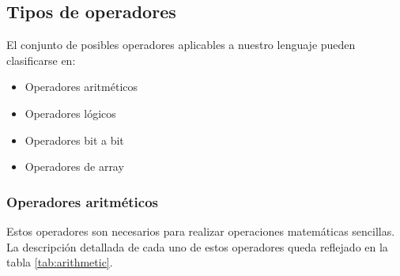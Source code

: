 \documentclass[11pt, english]{article}
\begin{document}
\subsection{Tipos de operadores}\label{operators}
El conjunto de posibles operadores aplicables a nuestro lenguaje pueden clasificarse en:
\begin{itemize}
	\item Operadores aritméticos
	\item Operadores lógicos
	\item Operadores bit a bit
	\item Operadores de array
\end{itemize}


\subsubsection{Operadores aritméticos}\label{arithmetic-operators}
Estos operadores son necesarios para realizar operaciones matemáticas sencillas. La descripción detallada de cada uno de estos operadores queda reflejado en la tabla \ref{tab:arithmetic}.
\end{document}
